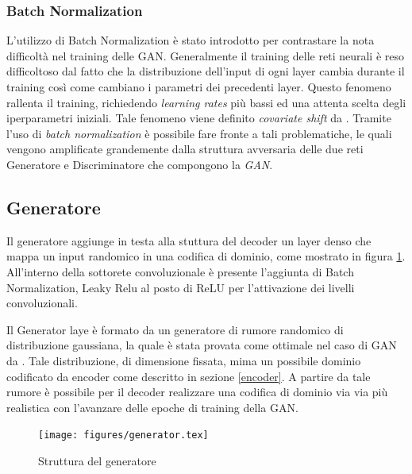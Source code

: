 \subsubsection{Batch Normalization}
L'utilizzo di Batch Normalization è stato introdotto per contrastare la nota difficoltà nel training delle GAN. Generalmente il training delle reti neurali è reso difficoltoso dal fatto che la distribuzione dell'input di ogni layer cambia durante il training così come cambiano i parametri dei precedenti layer. Questo fenomeno rallenta il training, richiedendo \textit{learning rates} più bassi ed una attenta scelta degli iperparametri iniziali. Tale fenomeno viene definito \textit{covariate shift} da \cite{1502.03167}. Tramite l'uso di \textit{batch normalization} è possibile fare fronte a tali problematiche, le quali vengono amplificate grandemente dalla struttura avversaria delle due reti Generatore e Discriminatore che compongono la \textit{GAN}. 

\subsection{Generatore}
\label{generator}
Il generatore aggiunge in testa alla stuttura del decoder un layer denso che mappa un input randomico in una codifica di dominio, come mostrato in figura \ref{fig:generator}. All'interno della sottorete convoluzionale è presente l'aggiunta di Batch Normalization, Leaky Relu al posto di ReLU per l'attivazione dei livelli convoluzionali.

Il Generator laye è formato da un generatore di rumore randomico di distribuzione gaussiana, la quale è stata provata come ottimale nel caso di GAN da \cite{gaussian}. Tale distribuzione, di dimensione fissata, mima un possibile dominio codificato da encoder come descritto in sezione \ref{encoder}. A partire da tale rumore è possibile per il decoder realizzare una codifica di dominio via via più realistica con l'avanzare delle epoche di training della GAN.

\begin{figure}[p]
    \centering
	\texttt{[image: figures/generator.tex]}
	\caption{Struttura del generatore}
\label{fig:generator}
\end{figure}


